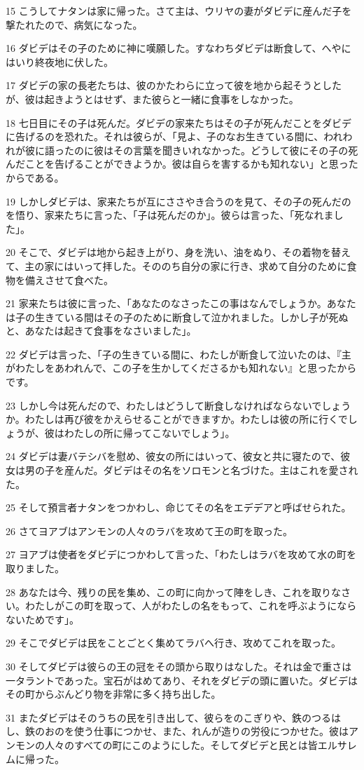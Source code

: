 \par 15 こうしてナタンは家に帰った。さて主は、ウリヤの妻がダビデに産んだ子を撃たれたので、病気になった。
\par 16 ダビデはその子のために神に嘆願した。すなわちダビデは断食して、へやにはいり終夜地に伏した。
\par 17 ダビデの家の長老たちは、彼のかたわらに立って彼を地から起そうとしたが、彼は起きようとはせず、また彼らと一緒に食事をしなかった。
\par 18 七日目にその子は死んだ。ダビデの家来たちはその子が死んだことをダビデに告げるのを恐れた。それは彼らが、「見よ、子のなお生きている間に、われわれが彼に語ったのに彼はその言葉を聞きいれなかった。どうして彼にその子の死んだことを告げることができようか。彼は自らを害するかも知れない」と思ったからである。
\par 19 しかしダビデは、家来たちが互にささやき合うのを見て、その子の死んだのを悟り、家来たちに言った、「子は死んだのか」。彼らは言った、「死なれました」。
\par 20 そこで、ダビデは地から起き上がり、身を洗い、油をぬり、その着物を替えて、主の家にはいって拝した。そののち自分の家に行き、求めて自分のために食物を備えさせて食べた。
\par 21 家来たちは彼に言った、「あなたのなさったこの事はなんでしょうか。あなたは子の生きている間はその子のために断食して泣かれました。しかし子が死ぬと、あなたは起きて食事をなさいました」。
\par 22 ダビデは言った、「子の生きている間に、わたしが断食して泣いたのは、『主がわたしをあわれんで、この子を生かしてくださるかも知れない』と思ったからです。
\par 23 しかし今は死んだので、わたしはどうして断食しなければならないでしょうか。わたしは再び彼をかえらせることができますか。わたしは彼の所に行くでしょうが、彼はわたしの所に帰ってこないでしょう」。
\par 24 ダビデは妻バテシバを慰め、彼女の所にはいって、彼女と共に寝たので、彼女は男の子を産んだ。ダビデはその名をソロモンと名づけた。主はこれを愛された。
\par 25 そして預言者ナタンをつかわし、命じてその名をエデデアと呼ばせられた。
\par 26 さてヨアブはアンモンの人々のラバを攻めて王の町を取った。
\par 27 ヨアブは使者をダビデにつかわして言った、「わたしはラバを攻めて水の町を取りました。
\par 28 あなたは今、残りの民を集め、この町に向かって陣をしき、これを取りなさい。わたしがこの町を取って、人がわたしの名をもって、これを呼ぶようにならないためです」。
\par 29 そこでダビデは民をことごとく集めてラバへ行き、攻めてこれを取った。
\par 30 そしてダビデは彼らの王の冠をその頭から取りはなした。それは金で重さは一タラントであった。宝石がはめてあり、それをダビデの頭に置いた。ダビデはその町からぶんどり物を非常に多く持ち出した。
\par 31 またダビデはそのうちの民を引き出して、彼らをのこぎりや、鉄のつるはし、鉄のおのを使う仕事につかせ、また、れんが造りの労役につかせた。彼はアンモンの人々のすべての町にこのようにした。そしてダビデと民とは皆エルサレムに帰った。

